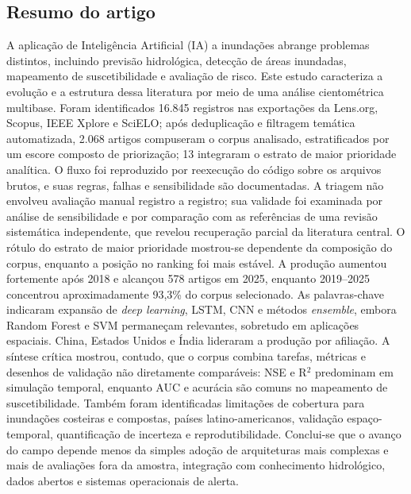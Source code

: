 %
\subsection*{Resumo do artigo}

\begingroup\small
\noindent A aplicação de Inteligência Artificial (IA) a inundações abrange problemas distintos, incluindo previsão hidrológica, detecção de áreas inundadas, mapeamento de suscetibilidade e avaliação de risco. Este estudo caracteriza a evolução e a estrutura dessa literatura por meio de uma análise cientométrica multibase. Foram identificados 16.845 registros nas exportações da Lens.org, Scopus, IEEE Xplore e SciELO; após deduplicação e filtragem temática automatizada, 2.068 artigos compuseram o corpus analisado, estratificados por um escore composto de priorização; 13 integraram o estrato de maior prioridade analítica. O fluxo foi reproduzido por reexecução do código sobre os arquivos brutos, e suas regras, falhas e sensibilidade são documentadas. A triagem não envolveu avaliação manual registro a registro; sua validade foi examinada por análise de sensibilidade e por comparação com as referências de uma revisão sistemática independente, que revelou recuperação parcial da literatura central. O rótulo do estrato de maior prioridade mostrou-se dependente da composição do corpus, enquanto a posição no ranking foi mais estável. A produção aumentou fortemente após 2018 e alcançou 578 artigos em 2025, enquanto 2019--2025 concentrou aproximadamente 93,3\% do corpus selecionado. As palavras-chave indicaram expansão de \textit{deep learning}, LSTM, CNN e métodos \textit{ensemble}, embora Random Forest e SVM permaneçam relevantes, sobretudo em aplicações espaciais. China, Estados Unidos e Índia lideraram a produção por afiliação. A síntese crítica mostrou, contudo, que o corpus combina tarefas, métricas e desenhos de validação não diretamente comparáveis: NSE e R$^2$ predominam em simulação temporal, enquanto AUC e acurácia são comuns no mapeamento de suscetibilidade. Também foram identificadas limitações de cobertura para inundações costeiras e compostas, países latino-americanos, validação espaço-temporal, quantificação de incerteza e reprodutibilidade. Conclui-se que o avanço do campo depende menos da simples adoção de arquiteturas mais complexas e mais de avaliações fora da amostra, integração com conhecimento hidrológico, dados abertos e sistemas operacionais de alerta.


